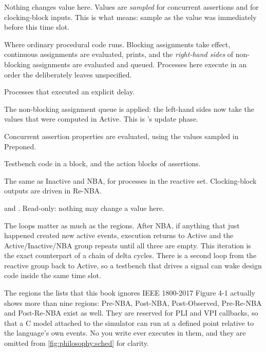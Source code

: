 \begin{description}[leftmargin=1.6em,style=nextline,font=\normalfont\ttfamily]
\item[Preponed] Nothing changes value here. Values are \emph{sampled} for
  concurrent assertions and for clocking-block inputs. This is what
   means: sample as the value was immediately before this time
  slot.
\item[Active] Where ordinary procedural code runs. Blocking assignments take
  effect, continuous assignments are evaluated,  prints, and
  the \emph{right-hand sides} of non-blocking assignments are evaluated and
  queued. Processes here execute in an order the \LRM{} deliberately leaves
  unspecified.
\item[Inactive] Processes that executed an explicit  delay.
\item[NBA] The non-blocking assignment queue is applied: the left-hand sides
  now take the values that were computed in Active. This is \VHDL{}'s update
  phase.
\item[Observed] Concurrent assertion properties are evaluated, using the values
  sampled in Preponed.
\item[Reactive] Testbench code in a  block, and the action blocks
  of assertions.
\item[Re-Inactive, Re-NBA] The same as Inactive and NBA, for processes in the
  reactive set. Clocking-block outputs are driven in Re-NBA.
\item[Postponed]  and . Read-only: nothing may
  change a value here.
\end{description}

The loops matter as much as the regions. After NBA, if anything that just
happened created new active events, execution returns to Active and the
Active/Inactive/NBA group repeats until all three are empty. This iteration is
the exact counterpart of a chain of \VHDL{} delta cycles. There is a second
loop from the reactive group back to Active, so a testbench that drives a
signal can wake design code inside the same time slot.

\begin{notebox}{The regions the \LRM{} lists that this book ignores}
IEEE 1800-2017 Figure 4-1 actually shows more than nine regions: Pre-NBA,
Post-NBA, Post-Observed, Pre-Re-NBA and Post-Re-NBA exist as well. They are
reserved for PLI and VPI callbacks, so that a C model attached to the simulator
can run at a defined point relative to the language's own events. No \SV{} you
write ever executes in them, and they are omitted from
\cref{fig:philosophy:sched} for clarity.
\end{notebox}

